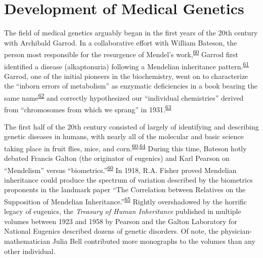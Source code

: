 \documentclass[11pt,letterpaper]{book}
\begin{document}
\hypertarget{medGen}{%
\section{Development of Medical Genetics}\label{medGen}}

The field of medical genetics arguably began in the first years of the 20th century with Archibald Garrod.
In a collaborative effort with William Bateson, the person most responsible for the resurgence of Mendel's work,\textsuperscript{\protect\hyperlink{ref-harper:2008aa}{60}} Garrod first identified a disease (alkaptonuria) following a Mendelian inheritance pattern.\textsuperscript{\protect\hyperlink{ref-garrod:1902aa}{61}}
Garrod, one of the initial pioneers in the biochemistry, went on to characterize the ``inborn errors of metabolism'' as enzymatic deficiencies in a book bearing the same name\textsuperscript{\protect\hyperlink{ref-garrod:1923aa}{62}} and correctly hypothesized our ``individual chemistries'' derived from ``chromosomes from which we sprang'' in 1931.\textsuperscript{\protect\hyperlink{ref-garrod:1931aa}{63}}

The first half of the 20th century consisted of largely of identifying and describing genetic diseases in humans, with nearly all of the molecular and basic science taking place in fruit flies, mice, and corn.\textsuperscript{\protect\hyperlink{ref-harper:2008aa}{60},\protect\hyperlink{ref-rimoin:2004aa}{64}}
During this time, Bateson hotly debated Francis Galton (the originator of eugenics) and Karl Pearson on ``Mendelism'' versus ``biometrics.''\textsuperscript{\protect\hyperlink{ref-harper:2008aa}{60}}
In 1918, R.A. Fisher proved Mendelian inheritance could produce the spectrum of variation described by the biometrics proponents in the landmark paper ``The Correlation between Relatives on the Supposition of Mendelian Inheritance.''\textsuperscript{\protect\hyperlink{ref-fisher:1919aa}{65}}
Rightly overshadowed by the horrific legacy of eugenics, the \emph{Treasury of Human Inheritance} published in multiple volumes between 1923 and 1958 by Pearson and the Galton Laboratory for National Eugenics described dozens of genetic disorders.
Of note, the physician-mathematician Julia Bell contributed more monographs to the volumes than any other individual.
\end{document}
